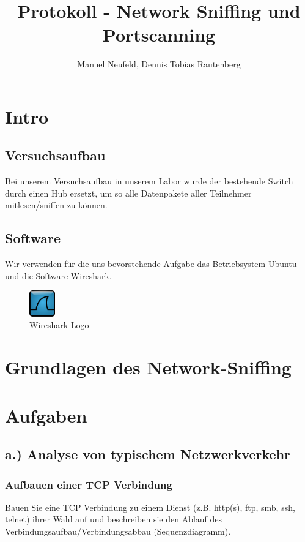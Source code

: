 \documentclass[a4paper]{report}
\title{Protokoll -  Network Sniffing und Portscanning}
\author{Manuel Neufeld, Dennis Tobias Rautenberg}
\begin{document}
\maketitle

\chapter{Intro}

\section{Versuchsaufbau}
Bei unserem Versuchsaufbau in unserem Labor wurde der bestehende Switch durch einen Hub ersetzt, um so alle Datenpakete aller Teilnehmer mitlesen/sniffen zu können.

\section{Software}
Wir verwenden für die uns bevorstehende Aufgabe das Betriebsystem Ubuntu und die Software Wireshark.

\begin{figure}[htb]
	\centering
		\includegraphics[width=0.10\textwidth]{wireshark-logo.png}
	\caption{Wireshark Logo}
	\label{fig:wiresharklogo}
\end{figure}

\chapter{Grundlagen des Network-Sniffing}

\chapter{Aufgaben}

\section{a.) Analyse von typischem Netzwerkverkehr}

\subsection{Aufbauen einer TCP Verbindung}
Bauen Sie eine TCP Verbindung zu einem Dienst (z.B. http(s), ftp, smb, ssh, telnet) ihrer Wahl auf und beschreiben sie den Ablauf des Verbindungsaufbau/Verbindungsabbau (Sequenzdiagramm).
\end{document}

